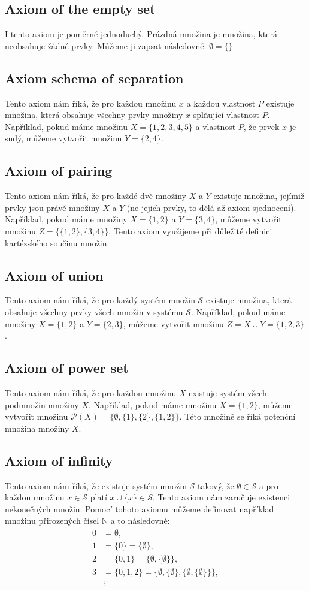 \subsection{Axiom of the empty set}
I tento axiom je poměrně jednoduchý. Prázdná množina je množina, která neobsahuje žádné prvky. Můžeme ji zapsat následovně: $\emptyset = \{\}$.
\subsection{Axiom schema of separation}
Tento axiom nám říká, že pro každou množinu $x$ a každou vlastnost $P$ existuje množina, která obsahuje všechny prvky množiny $x$ splňující vlastnost $P$. Například, pokud máme množinu $X = \{1, 2, 3, 4, 5\}$ a vlastnost $P$, že prvek $x$ je sudý, můžeme vytvořit množinu $Y = \{2, 4\}$.
\subsection{Axiom of pairing}
Tento axiom nám říká, že pro každé dvě množiny $X$ a $Y$ existuje množina, jejímiž prvky jsou právě množiny $X$ a $Y$ (ne jejich prvky, to dělá až axiom sjednocení). Například, pokud máme množiny $X = \{1, 2\}$ a $Y = \{3, 4\}$, můžeme vytvořit množinu $Z = \{\{1, 2\}, \{3, 4\}\}$. Tento axiom využijeme při důležité definici kartézského součinu množin.
\subsection{Axiom of union}
Tento axiom nám říká, že pro každý systém množin $\mathcal{S}$ existuje množina, která obsahuje všechny prvky všech množin v systému $\mathcal{S}$. Například, pokud máme množiny $X = \{1, 2\}$ a $Y = \{2, 3\}$, můžeme vytvořit množinu $Z = X\cup Y = \{1, 2, 3\}$.
\subsection{Axiom of power set}
Tento axiom nám říká, že pro každou množinu $X$ existuje systém všech podmnožin množiny $X$. Například, pokud máme množinu $X = \{1, 2\}$, můžeme vytvořit množinu $\mathcal{P}(X) = \{\emptyset, \{1\}, \{2\}, \{1, 2\}\}$. Této množině se říká potenční množina množiny $X$.
\subsection{Axiom of infinity} \label{axiom_of_infinity}
Tento axiom nám říká, že existuje systém množin $\mathcal{S}$ takový, že $\emptyset\in\mathcal{S}$ a pro každou množinu $x\in\mathcal{S}$ platí $x\cup\{x\}\in\mathcal{S}$. Tento axiom nám zaručuje existenci nekonečných množin. Pomocí tohoto axiomu můžeme definovat například množinu přirozených čísel $\mathbb{N}$ a to následovně:
\begin{align*}
  0 &= \emptyset,\\
  1 &= \{0\} = \{\emptyset\},\\
  2 &= \{0, 1\} = \{\emptyset, \{\emptyset\}\},\\
  3 &= \{0, 1, 2\} = \{\emptyset, \{\emptyset\}, \{\emptyset, \{\emptyset\}\}\},\\
  &\vdots
\end{align*}
